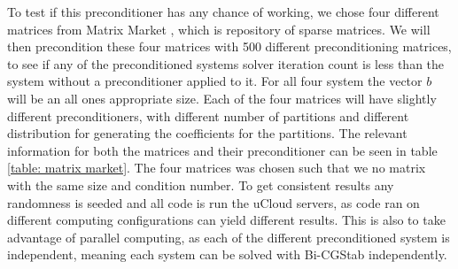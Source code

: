 To test if this preconditioner has any chance of working, we chose four different matrices from Matrix Market \cite{Matrix_market}, which is repository of sparse matrices. We will then precondition these four matrices with 500 different preconditioning matrices, to see if any of the preconditioned systems solver iteration count is less than the system without a preconditioner applied to it. For all four system the vector \(b\) will be an all ones appropriate size. Each of the four matrices will have slightly different preconditioners, with different number of partitions and different distribution for generating the coefficients for the partitions. The relevant information for both the matrices and their preconditioner can be seen in table \ref{table: matrix market}. The four matrices was chosen such that we no matrix with the same size and condition number. To get consistent results any randomness is seeded and all code is run the uCloud servers, as code ran on different computing configurations can yield different results. This is also to take advantage of parallel computing, as each of the different preconditioned system is independent, meaning each system can be solved with Bi-CGStab independently.

